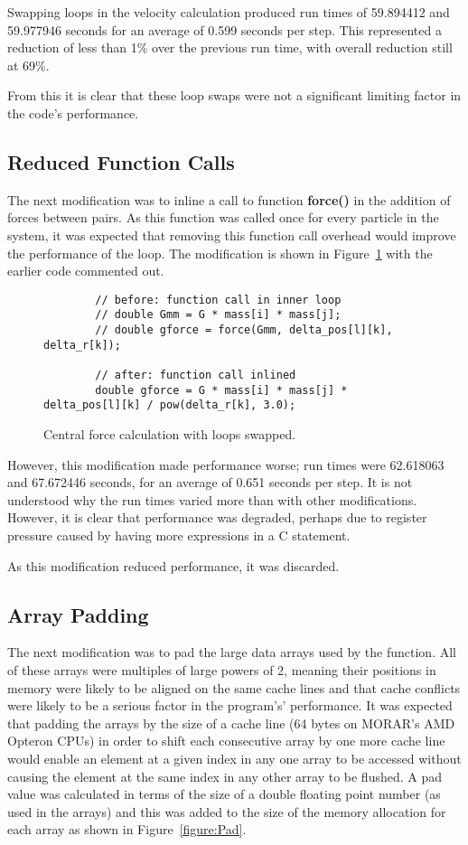 \documentclass[11pt, oneside]{article}   %
\begin{document}
Swapping loops in the velocity calculation produced run times of 59.894412 and 59.977946 seconds for an average of 0.599 seconds per step.
This represented a reduction of less than 1\% over the previous run time, with overall reduction still at 69\%.

From this it is clear that these loop swaps were not a significant limiting factor in the code's performance.

\subsection{Reduced Function Calls}
The next modification was to inline a call to function \textbf{force()} in the addition of forces between pairs.
As this function was called once for every particle in the system, it was expected that removing this function call overhead would improve the performance of the loop.
The modification is shown in Figure~\ref{figure:CallMod} with the earlier code commented out.

\begin{figure}
	\begin{lstlisting}
		// before: function call in inner loop
		// double Gmm = G * mass[i] * mass[j];
		// double gforce = force(Gmm, delta_pos[l][k], delta_r[k]);

		// after: function call inlined
		double gforce = G * mass[i] * mass[j] * delta_pos[l][k] / pow(delta_r[k], 3.0);
	\end{lstlisting}
	\caption{Central force calculation with loops swapped.}
	\label{figure:CallMod}
\end{figure}

However, this modification made performance worse; run times were 62.618063 and 67.672446 seconds, for an average of 0.651 seconds per step.
It is not understood why the run times varied more than with other modifications.
However, it is clear that performance was degraded, perhaps due to register pressure caused by having more expressions in a C statement.

As this modification reduced performance, it was discarded.

\subsection{Array Padding}
The next modification was to pad the large data arrays used by the function.
All of these arrays were multiples of large powers of 2, meaning their positions in memory were likely to be aligned on the same cache lines and that cache conflicts were likely to be a serious factor in the program's' performance.
It was expected that padding the arrays by the size of a cache line (64 bytes on MORAR's AMD Opteron CPUs) in order to shift each consecutive array by one more cache line would enable an element at a given index in any one array to be accessed without causing the element at the same index in any other array to be flushed.
A pad value was calculated in terms of the size of a double floating point number (as used in the arrays) and this was added to the size of the memory allocation for each array as shown in Figure~\ref{figure:Pad}.
\end{document}
